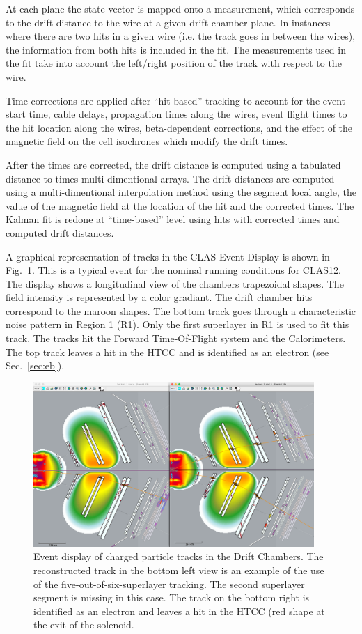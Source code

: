 At each plane the state vector is mapped onto a measurement, which corresponds to the drift distance to the
wire at a given drift chamber plane.  In instances where there are two hits in a given wire (i.e. the track
goes in between the wires), the information from both hits is included in the fit.
The measurements used in the fit
take into account the left/right position of the track with respect to the wire.

Time corrections are applied
after ``hit-based'' tracking to account for the event start time, cable delays, propagation times along the
wires, event flight times to the hit location along the wires, beta-dependent corrections, and the effect of
the magnetic field on the cell isochrones which modify the drift times.

After the times are corrected, the drift distance is computed using a tabulated distance-to-times
multi-dimentional arrays.  The drift distances are computed using a multi-dimentional interpolation method
using the segment local angle, the value of the magnetic field at the location of the hit and the corrected
times.  The Kalman fit is redone at ``time-based'' level using hits with corrected times and computed drift
distances.

A graphical representation of tracks in the CLAS Event Display is shown in Fig.~\ref{fig:dcTracks}.  
This is a typical event for the nominal running conditions for CLAS12.  The
display shows a longitudinal view of the chambers trapezoidal shapes. The field intensity is represented by a
color gradiant. The drift chamber hits correspond to the maroon shapes.  The bottom track goes through a
characteristic noise pattern in Region 1 (R1). Only the first superlayer in R1 is used to fit this track.  The
tracks hit the Forward Time-Of-Flight system and the Calorimeters.  The top track leaves a hit in the HTCC
and is identified as an electron (see Sec.~\ref{sec:eb}).

\begin{figure}
\centering
\includegraphics[width=0.95\textwidth]{pics/dcTrack3.png}
\caption{Event display of charged particle tracks in the Drift Chambers.  The reconstructed 
track in the bottom left view is an example of the use of the five-out-of-six-superlayer tracking. 
The second superlayer segment is missing in this case.  The track on the bottom right is identified 
as an electron and leaves a hit in the HTCC (red shape at the exit of the solenoid. 
}
\label{fig:dcTracks}
\end{figure}

